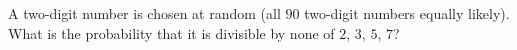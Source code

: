 A two-digit number is chosen at random (all $90$ two-digit numbers equally likely). What is the probability that it is divisible by none of $2$, $3$, $5$, $7$?
